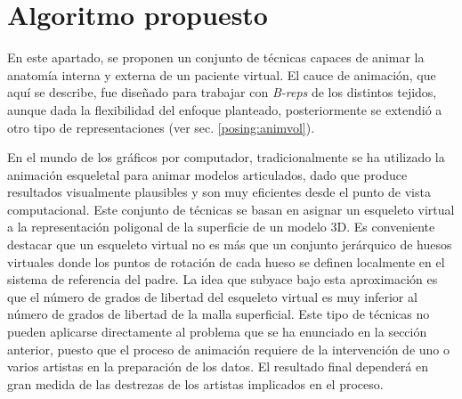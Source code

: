 \section{Algoritmo propuesto}
\label{posing:method}
En este apartado, se proponen un conjunto de técnicas capaces de animar la anatomía interna y externa de un paciente virtual. El cauce de animación, que aquí se describe, fue diseñado para trabajar con \emph{\acs{B-rep}s} de los distintos tejidos, aunque dada la flexibilidad del enfoque planteado, posteriormente se extendió a otro tipo de representaciones (ver sec. \ref{posing:animvol}). 
%

En el mundo de los gráficos por computador, tradicionalmente se ha utilizado la animación esqueletal para animar modelos articulados, dado que produce resultados visualmente plausibles y son muy eficientes desde el punto de vista computacional. Este conjunto de técnicas se basan en asignar un esqueleto virtual a la representación poligonal de la superficie de un modelo 3D. Es conveniente destacar que un esqueleto virtual no es más que un conjunto jerárquico de huesos virtuales donde los puntos de rotación de cada hueso se definen localmente en el sistema de referencia del padre. 
La idea que subyace bajo esta aproximación es que el número de grados de libertad del esqueleto virtual es muy inferior al número de grados de libertad de la malla superficial. Este tipo de técnicas no pueden aplicarse directamente al problema que se ha enunciado en la sección anterior, puesto que el proceso de animación requiere de la intervención de uno o varios artistas en la preparación de los datos. El resultado final dependerá en gran medida de las destrezas de los artistas implicados en el proceso. 

